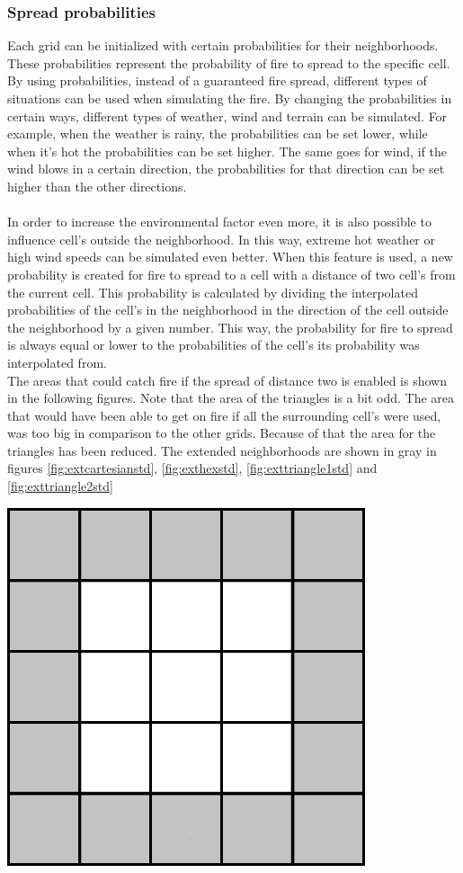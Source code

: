 \documentclass{article}
\newenvironment{Figure}
  {\par\medskip\noindent\minipage{\linewidth}}
  {\endminipage\par\medskip}
\begin{document}
\begin{multicols}{2}
\subsubsection*{Spread probabilities}
Each grid can be initialized with certain probabilities for their neighborhoods. These probabilities represent the probability of fire to spread to the specific cell. By using probabilities, instead of a guaranteed fire spread, different types of situations can be used when simulating the fire. By changing the probabilities in certain ways, different types of weather, wind and terrain can be simulated. For example, when the weather is rainy, the probabilities can be set lower, while when it’s hot the probabilities can be set higher. The same goes for wind, if the wind blows in a certain direction, the probabilities for that direction can be set higher than the other directions.\\\\
In order to increase the environmental factor even more, it is also possible to influence cell's outside the neighborhood. In this way, extreme hot weather or high wind speeds can be simulated even better. When this feature is used, a new probability is created for fire to spread to a cell with a distance of two cell's from the current cell. This probability is calculated by dividing the interpolated probabilities of the cell's in the neighborhood in the direction of the cell outside the neighborhood by a given number. This way, the probability for fire to spread is always equal or lower to the probabilities of the cell's its probability was interpolated from.\\
The areas that could catch fire if the spread of distance two is enabled is shown in the following figures. Note that the area of the triangles is a bit odd. The area that would have been able to get on fire if all the surrounding cell's were used, was too big in comparison to the other grids. Because of that the area for the triangles has been reduced. The extended neighborhoods are shown in gray in figures \ref{fig:extcartesianstd},  \ref{fig:exthexstd},  \ref{fig:exttriangle1std} and  \ref{fig:exttriangle2std}
\begin{Figure}
 \centering
 \includegraphics[width=0.79\textwidth]{imgs/extendedcartesian.png}

\end{Figure}
\end{multicols}
\end{document}
